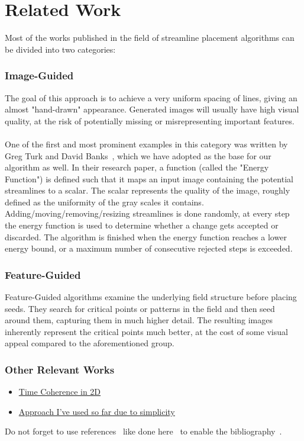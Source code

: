 \chapter{Related Work}
\label{sec:relatedWork}

Most of the works published in the field of streamline placement algorithms can be divided into two categories:
\subsection{Image-Guided}
The goal of this approach is to achieve a very uniform spacing of lines, giving an almost "hand-drawn" appearance.
Generated images will usually have high visual quality, at the risk of potentially missing or misrepresenting important features.
\\\\
One of the first and most prominent examples in this category was written by Greg Turk and David Banks~\cite{TurkBanks},
which we have adopted as the base for our algorithm as well.
In their research paper, a function (called the "Energy Function") is defined such that it maps an input image containing the potential streamlines to a scalar.
The scalar represents the quality of the image, roughly defined as the uniformity of the gray scales it contains. 
Adding/moving/removing/resizing streamlines is done randomly, at every step the energy function is used to determine whether a change gets accepted or discarded.
The algorithm is finished when the energy function reaches a lower energy bound, or a maximum number of consecutive rejected steps is exceeded.


\subsection{Feature-Guided}
Feature-Guided algorithms examine the underlying field structure before placing seeds.
They search for critical points or patterns in the field and then seed around them, capturing them in much higher detail.
The resulting images inherently represent the critical points much better, at the cost of some visual appeal compared to the aforementioned group.
\bigskip

\subsection{Other Relevant Works}
\begin{itemize}
    \item \href{https://www.cs.purdue.edu/homes/xmt/papers/Coherent-Streamline_Tsinghua_2012.pdf}{Time Coherence in 2D}
    \item \href{https://www.cg.tuwien.ac.at/courses/Visualisierung1/2015W/exercises/Streamlines_Jobard&Lefer.pdf}{Approach I've used so far due to simplicity}
\end{itemize}

Do not forget to use references~\cite{Hanser2019energy} like done here~\cite{Hofmann2019dependentVectors} to enable the bibliography~\cite{Jung2017tumble, Sagrista2019GaiaSky, Sdeo2018fullerene, Zheng2019equivalence}.